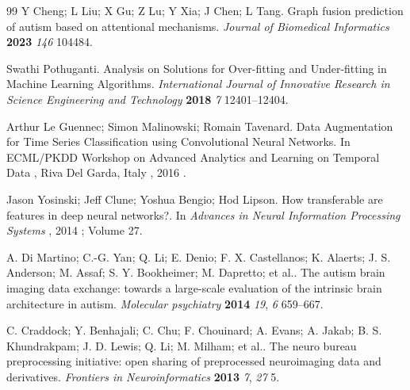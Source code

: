 \begin{thebibliography}{99}
Y Cheng; L Liu; X Gu; Z Lu; Y Xia; J Chen; L Tang. Graph fusion prediction of autism based on attentional mechanisms. \textit{Journal of Biomedical Informatics} \textbf{2023} \textit{146} 104484.

Swathi Pothuganti. Analysis on Solutions for Over-fitting and Under-fitting in Machine Learning Algorithms. \textit{International Journal of Innovative Research in Science Engineering and Technology} \textbf{2018} \textit{7} 12401--12404.

Arthur Le Guennec; Simon Malinowski; Romain Tavenard. Data Augmentation for Time Series Classification using Convolutional Neural Networks. In ECML/PKDD Workshop on Advanced Analytics and Learning on Temporal Data , Riva Del Garda, Italy , 2016 .

Jason Yosinski; Jeff Clune; Yoshua Bengio; Hod Lipson. How transferable are features in deep neural networks?. In \textit{Advances in Neural Information Processing Systems} , 2014 ; Volume 27.

A. Di Martino; C.-G. Yan; Q. Li; E. Denio; F. X. Castellanos; K. Alaerts; J. S. Anderson; M. Assaf; S. Y. Bookheimer; M. Dapretto; et al.. The autism brain imaging data exchange: towards a large-scale evaluation of the intrinsic brain architecture in autism. \textit{Molecular psychiatry} \textbf{2014} \textit{19}, \textit{6} 659--667.

C. Craddock; Y. Benhajali; C. Chu; F. Chouinard; A. Evans; A. Jakab; B. S. Khundrakpam; J. D. Lewis; Q. Li; M. Milham; et al.. The neuro bureau preprocessing initiative: open sharing of preprocessed neuroimaging data and derivatives. \textit{Frontiers in Neuroinformatics} \textbf{2013} \textit{7}, \textit{27} 5.

\end{thebibliography}
